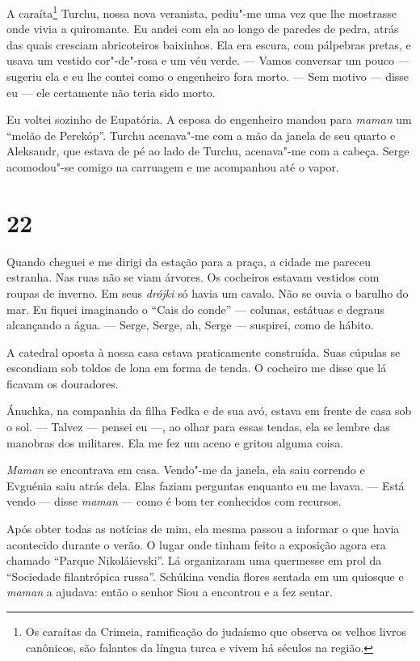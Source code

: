 A caraíta\footnote{Os caraítas da Crimeia, ramificação do judaísmo que
  observa os velhos livros canônicos, são falantes da língua turca e
  vivem há séculos na região.} Turchu, nossa nova veranista, pediu"-me
uma vez que lhe mostrasse onde vivia a quiromante. Eu andei com ela ao
longo de paredes de pedra, atrás das quais cresciam abricoteiros
baixinhos. Ela era escura, com pálpebras pretas, e usava um vestido
cor"-de"-rosa e um véu verde. --- Vamos conversar um pouco --- sugeriu ela
e eu lhe contei como o engenheiro fora morto. --- Sem motivo --- disse
eu --- ele certamente não teria sido morto.

Eu voltei sozinho de Eupatória. A esposa do engenheiro mandou para
\emph{maman} um ``melão de Perekóp''. Turchu acenava"-me com a mão da
janela de seu quarto e Aleksandr, que estava de pé ao lado de Turchu,
acenava"-me com a cabeça. Serge acomodou"-se comigo na carruagem e me
acompanhou até o vapor.

\section{22}

Quando cheguei e me dirigi da estação para a praça, a cidade me pareceu
estranha. Nas ruas não se viam árvores. Os cocheiros estavam vestidos
com roupas de inverno. Em seus \emph{drójki} só havia um cavalo. Não se
ouvia o barulho do mar. Eu fiquei imaginando o ``Cais do conde'' ---
colunas, estátuas e degraus alcançando a água. --- Serge, Serge, ah,
Serge --- suspirei, como de hábito.

A catedral oposta à nossa casa estava praticamente construída. Suas
cúpulas se escondiam sob toldos de lona em forma de tenda. O cocheiro me
disse que lá ficavam os douradores.

Ánuchka, na companhia da filha Fedka e de sua avó, estava em frente de
casa sob o sol. --- Talvez --- pensei eu ---, ao olhar para essas
tendas, ela se lembre das manobras dos militares. Ela me fez um aceno e
gritou alguma coisa.

\emph{Maman} se encontrava em casa. Vendo"-me da janela, ela saiu
correndo e Evguénia saiu atrás dela. Elas faziam perguntas enquanto eu
me lavava. --- Está vendo --- disse \emph{maman} --- como é bom ter
conhecidos com recursos.

Após obter todas as notícias de mim, ela mesma passou a informar o que
havia acontecido durante o verão. O lugar onde tinham feito a exposição
agora era chamado ``Parque Nikoláievski''. Lá organizaram uma quermesse
em prol da ``Sociedade filantrópica russa''. Schúkina vendia flores
sentada em um quiosque e \emph{maman} a ajudava: então o senhor Siou a
encontrou e a fez sentar.

